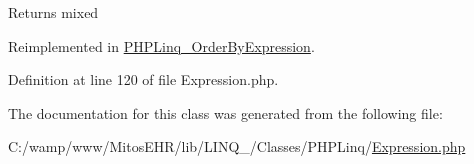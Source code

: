 \begin{DoxyReturn}{\-Returns}
mixed 
\end{DoxyReturn}


\-Reimplemented in \hyperlink{class_p_h_p_linq___order_by_expression_a13bec1b4324ac0cbd5d40826369f5135}{\-P\-H\-P\-Linq\-\_\-\-Order\-By\-Expression}.



\-Definition at line 120 of file \-Expression.\-php.




\-The documentation for this class was generated from the following file\-:\begin{DoxyCompactItemize}
\item 
\-C\-:/wamp/www/\-Mitos\-E\-H\-R/lib/\-L\-I\-N\-Q\-\_/\-Classes/\-P\-H\-P\-Linq/\hyperlink{_expression_8php}{\-Expression.\-php}\end{DoxyCompactItemize}
